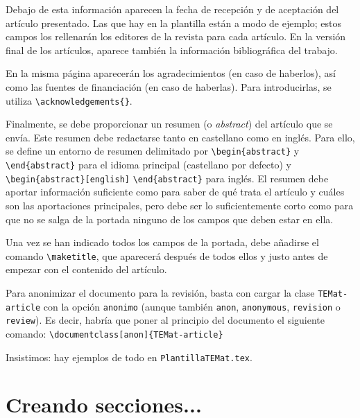 \documentclass{TEMat-article}
\begin{document}
Debajo de esta información aparecen la fecha de recepción y de aceptación del artículo presentado.
Las que hay en la plantilla están a modo de ejemplo; estos campos los rellenarán los editores de la revista para cada artículo.
En la versión final de los artículos, aparece también la información bibliográfica del trabajo.

En la misma página aparecerán los agradecimientos (en caso de haberlos), así como las fuentes de financiación (en caso de haberlas).
Para introducirlas, se utiliza \verb+\acknowledgements{}+.

Finalmente, se debe proporcionar un resumen (o \textit{abstract}) del artículo que se envía. Este resumen debe redactarse tanto en castellano como en inglés.
Para ello, se define un entorno de resumen delimitado por \verb+\begin{abstract}+ y \verb+\end{abstract}+ para el idioma principal (castellano por defecto) y \verb+\begin{abstract}[english]+ \verb+\end{abstract}+ para inglés.
El resumen debe aportar información suficiente como para saber de qué trata el artículo y cuáles son las aportaciones principales, pero debe ser lo suficientemente corto como para que no se salga de la portada ninguno de los campos que deben estar en ella.

Una vez se han indicado todos los campos de la portada, debe añadirse el comando \verb+\maketitle+, que aparecerá después de todos ellos y justo antes de empezar con el contenido del artículo.

Para anonimizar el documento para la revisión, basta con cargar la clase \verb+TEMat-article+ con la opción \verb+anonimo+ (aunque también \verb+anon+, \verb+anonymous+, \verb+revision+ o \verb+review+).
Es decir, habría que poner al principio del documento el siguiente comando: \verb+\documentclass[anon]{TEMat-article}+

Insistimos: hay ejemplos de todo en \verb+PlantillaTEMat.tex+.



\section{Creando secciones...}
\end{document}
